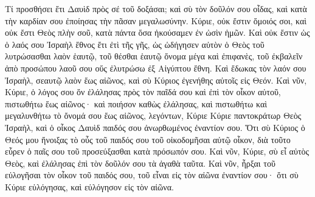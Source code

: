 {Τί προσθήσει ἔτι Δαυὶδ πρὸς σέ τοῦ δοξάσαι; καὶ σὺ τὸν δοῦλόν σου οἶδας,
καὶ κατὰ τὴν καρδίαν σου ἐποίησας τὴν πᾶσαν μεγαλωσύνην.
Κύριε, οὐκ ἔστιν ὅμοιός σοι, καὶ οὐκ ἔστι Θεὸς πλὴν σοῦ, κατὰ πάντα ὅσα ἠκούσαμεν ἐν ὠσὶν ἡμῶν.
Καὶ οὐκ ἔστιν ὡς ὁ λαός σου Ἰσραὴλ ἔθνος ἔτι ἐτὶ τῆς γῆς, ὡς ὡδήγησεν αὐτὸν ὁ Θεὸς τοῦ λυτρώσασθαι λαὸν ἑαυτῷ, τοῦ θέσθαι ἑαυτῷ ὄνομα μέγα καὶ ἐπιφανὲς, τοῦ ἐκβαλεῖν ἀπὸ προσώπου λαοῦ σου οὕς ἐλυτρώσω ἐξ Αἰγύπτου ἔθνη.
Καὶ ἔδωκας τὸν λαόν σου Ἰσραὴλ, σεαυτῷ λαὸν ἕως αἰῶνος, καὶ σὺ Κύριος ἐγενήθης αὐτοῖς εἰς Θεόν.
Καὶ νῦν, Κύριε, ὁ λόγος σου ὅν ἐλάλησας πρὸς τὸν παῖδά σου καὶ ἐπὶ τὸν οἶκον αὐτοῦ, πιστωθήτω ἕως αἰῶνος· καὶ ποιήσον καθὼς ἐλάλησας,
καὶ πιστωθήτω καὶ μεγαλυνθήτω τὸ ὄνομά σου ἕως αἰῶνος, λεγόντων, Κύριε Κύριε παντοκράτωρ Θεὸς Ἰσραὴλ, καὶ ὁ οἶκος Δαυὶδ παιδός σου ἀνωρθωμένος ἐναντίον σου.
Ὅτι σὺ Κύριος ὁ Θεός μου ἤνοιξας τὸ οὖς τοῦ παιδός σου τοῦ οἰκοδομῆσαι αὐτῷ οἶκον, διὰ τοῦτο εὗρεν ὁ παῖς σου τοῦ προσεύξασθαι κατὰ πρόσωπόν σου.
Καὶ νῦν, Κύριε, σὺ εἶ αὐτὸς Θεὸς, καὶ ἐλάλησας ἐπὶ τὸν δοῦλόν σου τὰ ἀγαθὰ ταῦτα.
Καὶ νῦν, ἦρξαι τοῦ εὐλογῆσαι τὸν οἶκον τοῦ παιδός σου, τοῦ εἶναι εἰς τὸν αἰῶνα ἐναντίον σου· ὅτι σὺ Κύριε εὑλόγησας, καὶ εὐλόγησον εἰς τὸν αἰῶνα.

}
